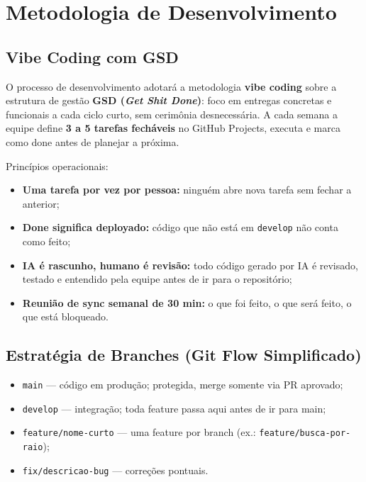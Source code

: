\documentclass[12pt, a4paper]{article}
\newcommand{\code}[1]{%
  \texttt{\small\colorbox{codeGray}{\vphantom{Ag}#1}}}
\begin{document}
\section{Metodologia de Desenvolvimento}

\subsection{Vibe Coding com GSD}

O processo de desenvolvimento adotará a metodologia
\textbf{vibe coding} sobre a estrutura de gestão
\textbf{GSD (\textit{Get Shit Done})}: foco em entregas concretas e
funcionais a cada ciclo curto, sem cerimônia desnecessária. A cada
semana a equipe define \textbf{3 a 5 tarefas fecháveis} no GitHub
Projects, executa e marca como done antes de planejar a próxima.

Princípios operacionais:

\begin{itemize}
  \item \textbf{Uma tarefa por vez por pessoa:} ninguém abre nova
        tarefa sem fechar a anterior;
  \item \textbf{Done significa deployado:} código que não está em
        \code{develop} não conta como feito;
  \item \textbf{IA é rascunho, humano é revisão:} todo código gerado
        por IA é revisado, testado e entendido pela equipe antes de ir
        para o repositório;
  \item \textbf{Reunião de sync semanal de 30 min:} o que foi feito,
        o que será feito, o que está bloqueado.
\end{itemize}

\subsection{Estratégia de Branches (Git Flow Simplificado)}

\begin{itemize}
  \item \code{main} --- código em produção; protegida, merge somente
        via PR aprovado;
  \item \code{develop} --- integração; toda feature passa aqui antes
        de ir para main;
  \item \code{feature/nome-curto} --- uma feature por branch
        (ex.: \code{feature/busca-por-raio});
  \item \code{fix/descricao-bug} --- correções pontuais.
\end{itemize}
\end{document}
